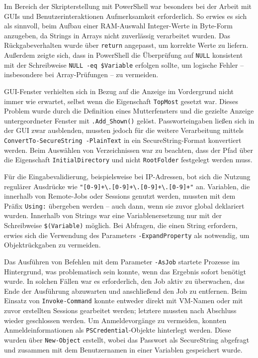 \documentclass[conference]{IEEEtran}
\begin{document}
Im Bereich der Skripterstellung mit PowerShell war besonders bei der Arbeit mit GUIs und Benutzerinteraktionen Aufmerksamkeit erforderlich. So erwies es sich als sinnvoll, beim Aufbau einer RAM-Auswahl Integer-Werte in Byte-Form anzugeben, da Strings in Arrays nicht zuverlässig verarbeitet wurden. Das Rückgabeverhalten wurde über \texttt{return} angepasst, um korrekte Werte zu liefern. Außerdem zeigte sich, dass in PowerShell die Überprüfung auf \texttt{NULL} konsistent mit der Schreibweise \texttt{NULL -eq \$Variable} erfolgen sollte, um logische Fehler -- insbesondere bei Array-Prüfungen -- zu vermeiden.  

GUI-Fenster verhielten sich in Bezug auf die Anzeige im Vordergrund nicht immer wie erwartet, selbst wenn die Eigenschaft \texttt{TopMost} gesetzt war. Dieses Problem wurde durch die Definition eines Mutterfensters und die gezielte Anzeige untergeordneter Fenster mit \texttt{.Add\_Shown()} gelöst. Passworteingaben ließen sich in der GUI zwar ausblenden, mussten jedoch für die weitere Verarbeitung mittels \texttt{ConvertTo-SecureString -PlainText} in ein SecureString-Format konvertiert werden. Beim Auswählen von Verzeichnissen war zu beachten, dass der Pfad über die Eigenschaft \texttt{InitialDirectory} und nicht \texttt{RootFolder} festgelegt werden muss.  

Für die Eingabevalidierung, beispielsweise bei IP-Adressen, bot sich die Nutzung regulärer Ausdrücke wie \texttt{"[0-9]+\textbackslash.[0-9]+\textbackslash.[0-9]+\textbackslash.[0-9]+"} an. Variablen, die innerhalb von Remote-Jobs oder Sessions genutzt werden, mussten mit dem Präfix \texttt{Using:} übergeben werden -- auch dann, wenn sie zuvor global deklariert wurden. Innerhalb von Strings war eine Variablenersetzung nur mit der Schreibweise \texttt{\$(Variable)} möglich. Bei Abfragen, die einen String erfordern, erwies sich die Verwendung des Parameters \texttt{-ExpandProperty} als notwendig, um Objektrückgaben zu vermeiden.  

Das Ausführen von Befehlen mit dem Parameter \texttt{-AsJob} startete Prozesse im Hintergrund, was problematisch sein konnte, wenn das Ergebnis sofort benötigt wurde. In solchen Fällen war es erforderlich, den Job aktiv zu überwachen, das Ende der Ausführung abzuwarten und anschließend den Job zu entfernen. Beim Einsatz von \texttt{Invoke-Command} konnte entweder direkt mit VM-Namen oder mit zuvor erstellten Sessions gearbeitet werden; letztere mussten nach Abschluss wieder geschlossen werden. Um Anmeldevorgänge zu vermeiden, konnten Anmeldeinformationen als \texttt{PSCredential}-Objekte hinterlegt werden. Diese wurden über \texttt{New-Object} erstellt, wobei das Passwort als SecureString abgefragt und zusammen mit dem Benutzernamen in einer Variablen gespeichert wurde.  
\end{document}
